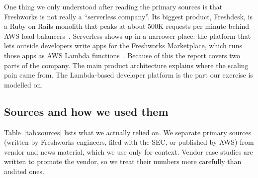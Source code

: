 \documentclass[10pt,a4paper]{article}
\begin{document}
One thing we only understood after reading the primary sources is that Freshworks is not really a ``serverless company''. Its biggest product, Freshdesk, is a Ruby on Rails monolith that peaks at about 500K requests per minute behind AWS load balancers~\cite{kumar2020}. Serverless shows up in a narrower place: the platform that lets outside developers write apps for the Freshworks Marketplace, which runs those apps as AWS Lambda functions~\cite{awslambda}. Because of this the report covers two parts of the company. The main product architecture explains where the scaling pain came from. The Lambda-based developer platform is the part our exercise is modelled on.

\subsection{Sources and how we used them}

Table~\ref{tab:sources} lists what we actually relied on. We separate primary sources (written by Freshworks engineers, filed with the SEC, or published by AWS) from vendor and news material, which we use only for context. Vendor case studies are written to promote the vendor, so we treat their numbers more carefully than audited ones.
\end{document}
